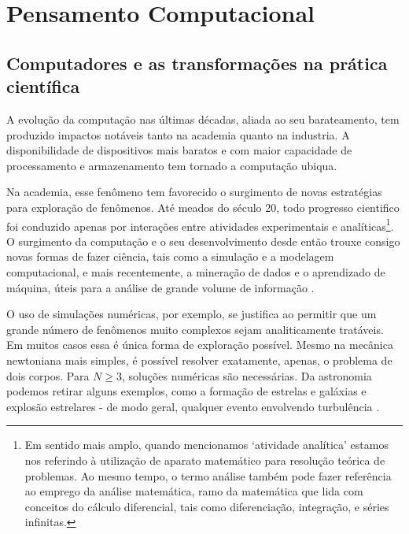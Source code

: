 \chapter{Pensamento Computacional}\label{pensamento-computacional}

\section{Computadores e as transformações na prática científica}




A evolução da computação nas últimas décadas, aliada ao seu barateamento, tem produzido impactos notáveis tanto na academia quanto na industria. A disponibilidade de dispositivos mais baratos e com maior capacidade de processamento e armazenamento tem tornado a computação ubiqua. 


Na academia, esse fenômeno tem favorecido o surgimento de novas estratégias para exploração de fenômenos. Até meados do século 20, todo progresso cientifico foi conduzido apenas por interações entre atividades experimentais e analíticas\footnote{
Em sentido mais amplo, quando mencionamos `atividade analítica' estamos nos referindo à utilização de aparato matemático para resolução teórica de problemas. Ao mesmo tempo, o termo análise também pode fazer referência ao emprego da análise matemática, ramo da matemática que lida com conceitos do cálculo diferencial, tais como diferenciação, integração, e séries infinitas.}. O surgimento da computação e o seu desenvolvimento desde então trouxe consigo novas formas de fazer ciência, tais como a simulação e a modelagem computacional, e mais recentemente, a mineração de dados e o aprendizado de máquina, úteis para a análise de grande volume de informação \cite{Djorgovski2005, wing2006}. %


O uso de simulações numéricas, por exemplo, se justifica ao permitir que um grande número de fenômenos muito complexos sejam analiticamente tratáveis. Em muitos casos essa é única forma de exploração possível. Mesmo na mecânica newtoniana mais simples, é possível resolver  exatamente, apenas, o problema de dois corpos. Para $N\geq3$, soluções numéricas são necessárias. Da astronomia podemos retirar alguns exemplos, como a formação de estrelas e galáxias e explosão estrelares - de modo geral, qualquer evento envolvendo turbulência  \cite[]{Djorgovski2005}. %

